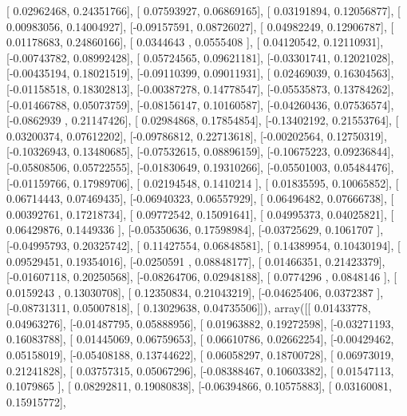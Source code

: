 \documentclass{article}
\begin{document}
       [ 0.02962468,  0.24351766],
       [ 0.07593927,  0.06869165],
       [ 0.03191894,  0.12056877],
       [ 0.00983056,  0.14004927],
       [-0.09157591,  0.08726027],
       [ 0.04982249,  0.12906787],
       [ 0.01178683,  0.24860166],
       [ 0.0344643 ,  0.0555408 ],
       [ 0.04120542,  0.12110931],
       [-0.00743782,  0.08992428],
       [ 0.05724565,  0.09621181],
       [-0.03301741,  0.12021028],
       [-0.00435194,  0.18021519],
       [-0.09110399,  0.09011931],
       [ 0.02469039,  0.16304563],
       [-0.01158518,  0.18302813],
       [-0.00387278,  0.14778547],
       [-0.05535873,  0.13784262],
       [-0.01466788,  0.05073759],
       [-0.08156147,  0.10160587],
       [-0.04260436,  0.07536574],
       [-0.0862939 ,  0.21147426],
       [ 0.02984868,  0.17854854],
       [-0.13402192,  0.21553764],
       [ 0.03200374,  0.07612202],
       [-0.09786812,  0.22713618],
       [-0.00202564,  0.12750319],
       [-0.10326943,  0.13480685],
       [-0.07532615,  0.08896159],
       [-0.10675223,  0.09236844],
       [-0.05808506,  0.05722555],
       [-0.01830649,  0.19310266],
       [-0.05501003,  0.05484476],
       [-0.01159766,  0.17989706],
       [ 0.02194548,  0.1410214 ],
       [ 0.01835595,  0.10065852],
       [ 0.06714443,  0.07469435],
       [-0.06940323,  0.06557929],
       [ 0.06496482,  0.07666738],
       [ 0.00392761,  0.17218734],
       [ 0.09772542,  0.15091641],
       [ 0.04995373,  0.04025821],
       [ 0.06429876,  0.1449336 ],
       [-0.05350636,  0.17598984],
       [-0.03725629,  0.1061707 ],
       [-0.04995793,  0.20325742],
       [ 0.11427554,  0.06848581],
       [ 0.14389954,  0.10430194],
       [ 0.09529451,  0.19354016],
       [-0.0250591 ,  0.08848177],
       [ 0.01466351,  0.21423379],
       [-0.01607118,  0.20250568],
       [-0.08264706,  0.02948188],
       [ 0.0774296 ,  0.0848146 ],
       [ 0.0159243 ,  0.13030708],
       [ 0.12350834,  0.21043219],
       [-0.04625406,  0.0372387 ],
       [-0.08731311,  0.05007818],
       [ 0.13029638,  0.04735506]]), array([[ 0.01433778,  0.04963276],
       [-0.01487795,  0.05888956],
       [ 0.01963882,  0.19272598],
       [-0.03271193,  0.16083788],
       [ 0.01445069,  0.06759653],
       [ 0.06610786,  0.02662254],
       [-0.00429462,  0.05158019],
       [-0.05408188,  0.13744622],
       [ 0.06058297,  0.18700728],
       [ 0.06973019,  0.21241828],
       [ 0.03757315,  0.05067296],
       [-0.08388467,  0.10603382],
       [ 0.01547113,  0.1079865 ],
       [ 0.08292811,  0.19080838],
       [-0.06394866,  0.10575883],
       [ 0.03160081,  0.15915772],
\end{document}
